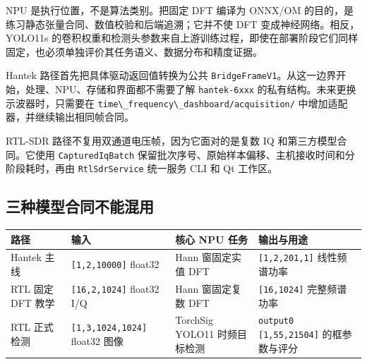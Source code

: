 NPU 是执行位置，不是算法类别。把固定 DFT 编译为 ONNX/OM
的目的，是练习静态张量合同、数值校验和后端追溯；它并不使 DFT
变成神经网络。相反，YOLO11s
的卷积权重和检测头参数来自上游训练过程，即使在部署阶段它们同样固定，也必须单独评价其任务语义、数据分布和精度证据。

Hantek 路径首先把具体驱动返回值转换为公共
\passthrough{\lstinline!BridgeFrameV1!}。从这一边界开始，处理、NPU、存储和界面都不需要了解
\passthrough{\lstinline!hantek-6xxx!}
的私有结构。未来更换示波器时，只需要在
\passthrough{\lstinline!time\_frequency\_dashboard/acquisition/!}
中增加适配器，并继续输出相同帧合同。

RTL-SDR 路径不复用双通道电压帧，因为它面对的是复数 IQ
和第三方模型合同。它使用 \passthrough{\lstinline!CapturedIqBatch!}
保留批次序号、原始样本偏移、主机接收时间和分阶段耗时，再由
\passthrough{\lstinline!RtlSdrService!} 统一服务 CLI 和 Qt 工作区。

\subsection{三种模型合同不能混用}\label{src-experiment-case5-model-contracts}

\begin{longtable}[]{@{}
  >{\raggedright\arraybackslash}p{}
  >{\raggedright\arraybackslash}p{}
  >{\raggedright\arraybackslash}p{}
  >{\raggedright\arraybackslash}p{}@{}}
\toprule\noalign{}
\begin{minipage}[b]{\linewidth}\raggedright
路径
\end{minipage} & \begin{minipage}[b]{\linewidth}\raggedright
输入
\end{minipage} & \begin{minipage}[b]{\linewidth}\raggedright
核心 NPU 任务
\end{minipage} & \begin{minipage}[b]{\linewidth}\raggedright
输出与用途
\end{minipage} \\
\midrule\noalign{}
\endhead
\bottomrule\noalign{}
\endlastfoot
Hantek 主线 & \passthrough{\lstinline![1,2,10000]!} float32 & Hann
窗固定实值 DFT & \passthrough{\lstinline![1,2,201,1]!} 线性频谱功率 \\
RTL 固定 DFT 教学 & \passthrough{\lstinline![16,2,1024]!} float32 I/Q &
Hann 窗固定复数 DFT & \passthrough{\lstinline![16,1024]!}
完整频谱功率 \\
RTL 正式检测 & \passthrough{\lstinline![1,3,1024,1024]!} float32 图像 &
TorchSig YOLO11 时频目标检测 &
\passthrough{\lstinline!output0 [1,55,21504]!} 的框参数与评分 \\
\end{longtable}

